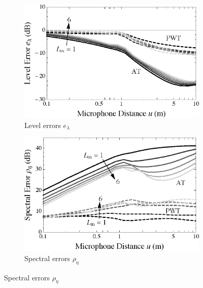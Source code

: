 \begin{figure}[t]
    	\centering
	\begin{subfigure}[b]{0.49\textwidth}
        		\includegraphics[width=\textwidth]{07_characterization_extrapolation/figures/audibleEnergy_order.eps}
        		\caption{Level errors $e_\lambda$}
        		\label{fig:07_Characterization_Extrapolation:Level_Errors:Order}
    	\end{subfigure}
	\hfill
    	\begin{subfigure}[b]{0.49\textwidth}
        		\includegraphics[width=\textwidth]{07_characterization_extrapolation/figures/scharer2009_order.eps}
        		\caption{Spectral errors $\rho_\eta$}
        		\label{fig:07_Characterization_Extrapolation:Spectral_Errors:Order}
    	\end{subfigure}
	

\end{figure}
